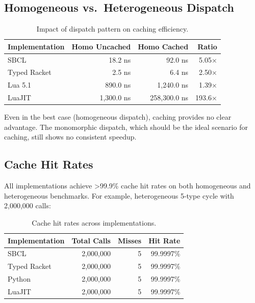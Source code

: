 \documentclass[sigplan,final]{acmart}
\begin{document}
\subsection{Homogeneous vs.~Heterogeneous Dispatch}

\begin{table}[h]
\centering
\caption{Impact of dispatch pattern on caching efficiency.}
\label{tab:homo-hetero}
\begin{tabular}{@{}lrrr@{}}
\toprule
\textbf{Implementation} & \textbf{Homo Uncached} & \textbf{Homo Cached} & \textbf{Ratio} \\
\midrule
SBCL & 18.2 ns & 92.0 ns & 5.05× \\
Typed Racket & 2.5 ns & 6.4 ns & 2.50× \\
Lua 5.1 & 890.0 ns & 1,240.0 ns & 1.39× \\
LuaJIT & 1,300.0 ns & 258,300.0 ns & 193.6× \\
\bottomrule
\end{tabular}
\end{table}

Even in the best case (homogeneous dispatch), caching provides no clear advantage. The
monomorphic dispatch, which should be the ideal scenario for caching, still shows no consistent
speedup.

\subsection{Cache Hit Rates}

All implementations achieve >99.9\% cache hit rates on both homogeneous and heterogeneous
benchmarks. For example, heterogeneous 5-type cycle with 2,000,000 calls:

\begin{table}[h]
\centering
\caption{Cache hit rates across implementations.}
\label{tab:hit-rates}
\begin{tabular}{@{}lrrr@{}}
\toprule
\textbf{Implementation} & \textbf{Total Calls} & \textbf{Misses} & \textbf{Hit Rate} \\
\midrule
SBCL & 2,000,000 & 5 & 99.9997\% \\
Typed Racket & 2,000,000 & 5 & 99.9997\% \\
Python & 2,000,000 & 5 & 99.9997\% \\
LuaJIT & 2,000,000 & 5 & 99.9997\% \\
\bottomrule
\end{tabular}
\end{table}
\end{document}
